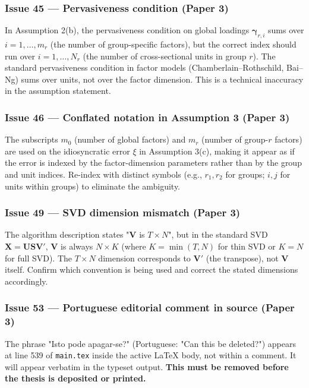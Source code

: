 \documentclass[11pt,a4paper]{article}
\begin{document}
\subsubsection*{Issue 45 — Pervasiveness condition (Paper 3)}

In Assumption 2(b), the pervasiveness condition on global loadings $\boldsymbol{\gamma}_{r,i}$ sums over $i=1,\ldots,m_r$ (the number of group-specific factors), but the correct index should run over $i=1,\ldots,N_r$ (the number of cross-sectional units in group $r$). The standard pervasiveness condition in factor models (Chamberlain–Rothschild, Bai–Ng) sums over units, not over the factor dimension. This is a technical inaccuracy in the assumption statement.

\subsubsection*{Issue 46 — Conflated notation in Assumption 3 (Paper 3)}

The subscripts $m_0$ (number of global factors) and $m_r$ (number of group-$r$ factors) are used on the idiosyncratic error $\xi$ in Assumption 3(c), making it appear as if the error is indexed by the factor-dimension parameters rather than by the group and unit indices. Re-index with distinct symbols (e.g., $r_1, r_2$ for groups; $i, j$ for units within groups) to eliminate the ambiguity.

\subsubsection*{Issue 49 — SVD dimension mismatch (Paper 3)}

The algorithm description states "$\boldsymbol{V}$ is $T \times N$", but in the standard SVD $\boldsymbol{X} = \boldsymbol{U}\boldsymbol{S}\boldsymbol{V}'$, $\boldsymbol{V}$ is always $N \times K$ (where $K = \min(T,N)$ for thin SVD or $K = N$ for full SVD). The $T \times N$ dimension corresponds to $\boldsymbol{V}'$ (the transpose), not $\boldsymbol{V}$ itself. Confirm which convention is being used and correct the stated dimensions accordingly.

\subsubsection*{Issue 53 — Portuguese editorial comment in source (Paper 3)}

The phrase "Isto pode apagar-se?" (Portuguese: "Can this be deleted?") appears at line 539 of \texttt{main.tex} inside the active LaTeX body, not within a comment. It will appear verbatim in the typeset output. \textbf{This must be removed before the thesis is deposited or printed.}
\end{document}
